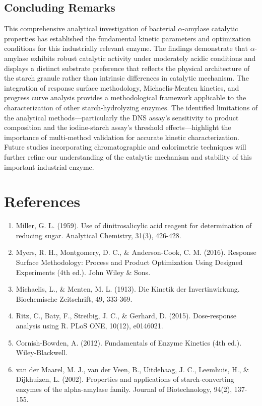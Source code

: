 \documentclass[
  12pt,
]{article}
\begin{document}
\subsection{Concluding Remarks}\label{concluding-remarks}

This comprehensive analytical investigation of bacterial
\(\alpha\)-amylase catalytic properties has established the fundamental
kinetic parameters and optimization conditions for this industrially
relevant enzyme. The findings demonstrate that \(\alpha\)-amylase
exhibits robust catalytic activity under moderately acidic conditions
and displays a distinct substrate preference that reflects the physical
architecture of the starch granule rather than intrinsic differences in
catalytic mechanism. The integration of response surface methodology,
Michaelis-Menten kinetics, and progress curve analysis provides a
methodological framework applicable to the characterization of other
starch-hydrolyzing enzymes. The identified limitations of the analytical
methods---particularly the DNS assay's sensitivity to product
composition and the iodine-starch assay's threshold effects---highlight
the importance of multi-method validation for accurate kinetic
characterization. Future studies incorporating chromatographic and
calorimetric techniques will further refine our understanding of the
catalytic mechanism and stability of this important industrial enzyme.

\section{References}\label{references}

\begin{enumerate}
\def\labelenumi{\arabic{enumi}.}
\item
  Miller, G. L. (1959). Use of dinitrosalicylic acid reagent for
  determination of reducing sugar. Analytical Chemistry, 31(3), 426-428.
\item
  Myers, R. H., Montgomery, D. C., \& Anderson-Cook, C. M. (2016).
  Response Surface Methodology: Process and Product Optimization Using
  Designed Experiments (4th ed.). John Wiley \& Sons.
\item
  Michaelis, L., \& Menten, M. L. (1913). Die Kinetik der
  Invertinwirkung. Biochemische Zeitschrift, 49, 333-369.
\item
  Ritz, C., Baty, F., Streibig, J. C., \& Gerhard, D. (2015).
  Dose-response analysis using R. PLoS ONE, 10(12), e0146021.
\item
  Cornish-Bowden, A. (2012). Fundamentals of Enzyme Kinetics (4th ed.).
  Wiley-Blackwell.
\item
  van der Maarel, M. J., van der Veen, B., Uitdehaag, J. C., Leemhuis,
  H., \& Dijkhuizen, L. (2002). Properties and applications of
  starch-converting enzymes of the alpha-amylase family. Journal of
  Biotechnology, 94(2), 137-155.
\end{enumerate}


\end{document}
